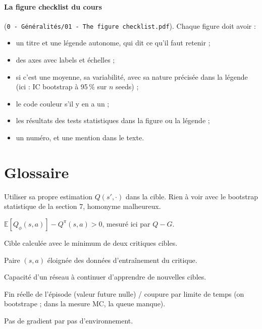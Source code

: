 \documentclass[11pt,a4paper]{article}
\newcommand{\E}{\mathbb{E}}
\newcommand{\code}[1]{\texttt{#1}}
\begin{document}
\paragraph{La figure checklist du cours} (\code{0 - Généralités/01 - The figure checklist.pdf}). Chaque
figure doit avoir :
\begin{itemize}
  \item un titre et une légende autonome, qui dit ce qu'il faut retenir ;
  \item des axes avec labels et échelles ;
  \item si c'est une moyenne, sa variabilité, avec sa nature précisée dans la légende (ici : IC
    bootstrap à 95\,\% sur $n$ seeds) ;
  \item le code couleur s'il y en a un ;
  \item les résultats des tests statistiques dans la figure ou la légende ;
  \item un numéro, et une mention dans le texte.
\end{itemize}

\section{Glossaire}
\begin{description}[style=nextline, leftmargin=1.5em]
  \item[Bootstrap (en TD)] Utiliser sa propre estimation $Q(s',\cdot)$ dans la cible. Rien à voir
    avec le bootstrap statistique de la section 7, homonyme malheureux.
  \item[Biais de surestimation] $\E[Q_\phi(s,a)] - Q^\pi(s,a) > 0$, mesuré ici par $Q - G$.
  \item[Clipped double-Q] Cible calculée avec le minimum de deux critiques cibles.
  \item[Hors distribution (OOD)] Paire $(s,a)$ éloignée des données d'entraînement du critique.
  \item[Plasticité] Capacité d'un réseau à continuer d'apprendre de nouvelles cibles.
  \item[Terminated / truncated] Fin réelle de l'épisode (valeur future nulle) / coupure par limite de
    temps (on bootstrape ; dans la mesure MC, la queue manque).
  \item[UTD ratio] Pas de gradient par pas d'environnement.
\end{description}



\end{document}
